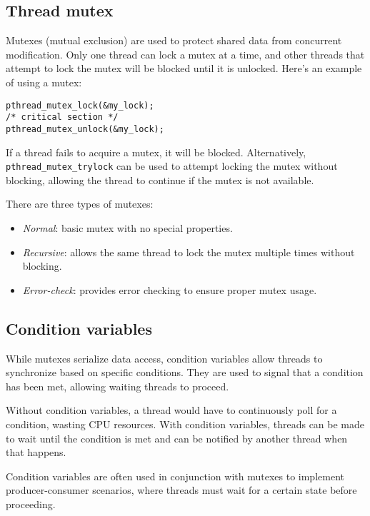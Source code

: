 \subsection{Thread mutex}
Mutexes (mutual exclusion) are used to protect shared data from concurrent modification. 
Only one thread can lock a mutex at a time, and other threads that attempt to lock the mutex will be blocked until it is unlocked. 
Here's an example of using a mutex:
\begin{lstlisting}[style=C]
pthread_mutex_lock(&my_lock);
/* critical section */
pthread_mutex_unlock(&my_lock);
\end{lstlisting}
If a thread fails to acquire a mutex, it will be blocked. 
Alternatively, \texttt{pthread\_mutex\_trylock} can be used to attempt locking the mutex without blocking, allowing the thread to continue if the mutex is not available.

\noindent There are three types of mutexes:
\begin{itemize}
    \item \textit{Normal}: basic mutex with no special properties.
    \item \textit{Recursive}: allows the same thread to lock the mutex multiple times without blocking.
    \item \textit{Error-check}: provides error checking to ensure proper mutex usage.
\end{itemize}

\subsection{Condition variables}
While mutexes serialize data access, condition variables allow threads to synchronize based on specific conditions. 
They are used to signal that a condition has been met, allowing waiting threads to proceed.

Without condition variables, a thread would have to continuously poll for a condition, wasting CPU resources.
With condition variables, threads can be made to wait until the condition is met and can be notified by another thread when that happens.

Condition variables are often used in conjunction with mutexes to implement producer-consumer scenarios, where threads must wait for a certain state before proceeding.